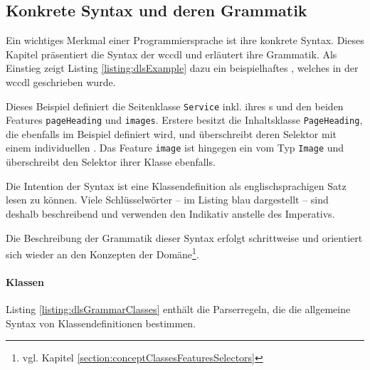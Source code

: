 \subsection{Konkrete Syntax und deren Grammatik}
    Ein wichtiges Merkmal einer Programmiersprache ist ihre konkrete Syntax.
    Dieses Kapitel präsentiert die Syntax der \gls{wccdl} und erläutert ihre Grammatik.    
    Als Einstieg zeigt Listing \ref{listing:dlsExample}
    dazu ein beispielhaftes {\classificationModel},
    welches in der \gls{wccdl} geschrieben wurde.

    

    Dieses Beispiel definiert die Seitenklasse \texttt{Service} inkl.
    ihres {\urlSelector}s und den beiden Features \texttt{pageHeading} und \texttt{images}.
    Erstere besitzt die Inhaltsklasse \texttt{PageHeading}, die ebenfalls im Beispiel definiert wird,
    und überschreibt deren Selektor mit einem individuellen {\cssSelector}.
    Das Feature \texttt{image} ist hingegen ein {} vom Typ
    \texttt{Image} und überschreibt den Selektor ihrer Klasse ebenfalls.

    Die Intention der Syntax ist eine Klassendefinition
    als englischsprachigen Satz lesen zu können.
    Viele Schlüsselwörter -- im Listing blau dargestellt --
    sind deshalb beschreibend und verwenden
    den Indikativ anstelle des Imperativs.  

    Die Beschreibung der Grammatik dieser Syntax erfolgt schrittweise
    und orientiert sich wieder an den Konzepten der
    Domäne\footnote{vgl. Kapitel \ref{section:conceptClassesFeaturesSelectors}}.
    
    \paragraph{Klassen}
    Listing \ref{listing:dlsGrammarClasses} enthält die Parserregeln,
    die die allgemeine Syntax von Klassendefinitionen bestimmen.

    

